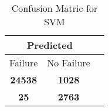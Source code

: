 \begin{table}[] 
\caption{Confusion Matric for SVM} 
\label{Table: Prediction Accuracy-NoneSVM90.0EKF-ignoreReflection-Reflection} 
\centering 
\begin{tabular} 
 {@{}ccc@{}} 
\toprule 
\multicolumn{2}{c}{\textbf{Predicted}}
 \\ \midrule 
\multicolumn{1}{|c|}{Failure} & 
\multicolumn{1}{c|}{No Failure}
 \\ \midrule 
\multicolumn{1}{|c|}{\color{green}\textbf{24538}} & 
\multicolumn{1}{c|}{\color{red}\textbf{1028}}
 \\ \midrule 
\multicolumn{1}{|c|}{\color{red}\textbf{25}} & 
\multicolumn{1}{c|}{\color{green}\textbf{2763}}
 \\ \bottomrule 
\end{tabular} 
\end{table} 
